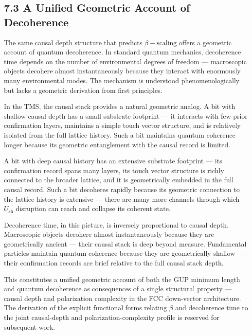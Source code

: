 \documentclass[11pt,oneside]{report}
\theoremstyle{definition}
\theoremstyle{remark}
\begin{document}
\subsection*{7.3 A Unified Geometric Account of Decoherence}

The same causal depth structure that predicts \ensuremath{\beta -\text{scaling}} offers a
geometric account of quantum decoherence. In standard quantum mechanics,
decoherence time depends on the number of environmental degrees of
freedom --- macroscopic objects decohere almost instantaneously because
they interact with enormously many environmental modes. The mechanism is
understood phenomenologically but lacks a geometric derivation from
first principles.

In the TMS, the causal stack provides a natural geometric analog. A bit
with shallow causal depth has a small substrate footprint --- it
interacts with few prior confirmation layers, maintains a simple touch
vector structure, and is relatively isolated from the full lattice
history. Such a bit maintains quantum coherence longer because its
geometric entanglement with the causal record is limited.

A bit with deep causal history has an extensive substrate footprint ---
its confirmation record spans many layers, its touch vector structure is
richly connected to the broader lattice, and it is geometrically
embedded in the full causal record. Such a bit decoheres rapidly because
its geometric connection to the lattice history is extensive --- there
are many more channels through which \ensuremath{U_{\mathrm{sh}}} disruption can reach and
collapse its coherent state.

Decoherence time, in this picture, is inversely proportional to causal
depth. Macroscopic objects decohere almost instantaneously because they
are geometrically ancient --- their causal stack is deep beyond measure.
Fundamental particles maintain quantum coherence because they are
geometrically shallow --- their confirmation records are brief relative
to the full causal stack depth.

This constitutes a unified geometric account of both the GUP minimum
length and quantum decoherence as consequences of a single structural
property --- causal depth and polarization complexity in the FCC
down-vector architecture. The derivation of the explicit functional
forms relating \ensuremath{\beta} and decoherence time to the joint causal-depth and
polarization-complexity profile is reserved for subsequent work.
\end{document}
